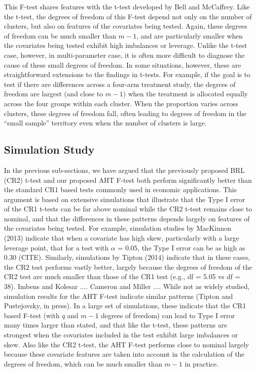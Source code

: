 \documentclass[12pt]{article}
\begin{document}
This F-test shares features with the t-test developed by Bell and McCaffrey. Like the t-test, the degrees of freedom of this F-test depend not only on the number of clusters, but also on features of the covariates being tested. 
Again, these degrees of freedom can be much smaller than $m - 1$, and are particularly smaller when the covariates being tested exhibit high imbalances or leverage. 
Unlike the t-test case, however, in multi-parameter case, it is often more difficult to diagnose the cause of these small degrees of freedom. 
In some situations, however, these are straightforward extensions to the findings in t-tests. 
For example, if the goal is to test if there are differences across a four-arm treatment study, the degrees of freedom are largest (and close to $m - 1$) when the treatment is allocated equally across the four groups within each cluster. 
When the proportion varies across clusters, these degrees of freedom fall, often leading to degrees of freedom in the ``small sample'' territory even when the number of clusters is large. 

\subsection{Simulation Study}

In the previous sub-sections, we have argued that the previously proposed BRL (CR2) t-test and our proposed AHT F-test both perform significantly better than the standard CR1 based tests commonly used in economic applications. 
This argument is based on extensive simulations that illustrate that the Type I error of the CR1 t-tests can be far above nominal while the CR2 t-test remains close to nominal, and that the differences in these patterns depends largely on features of the covariates being tested. 
For example, simulation studies by MacKinnon (2013) indicate that when a covariate has high skew, particularly with a large leverage point, that for a test with $\alpha$ = 0.05, the Type I error can be as high as 0.30 (CITE).
Similarly, simulations by Tipton (2014) indicate that in these cases, the CR2 test performs vastly better, largely because the degrees of freedom of the CR2 test are much smaller than those of the CR1 test (e.g., df = 5.05 vs df = 38).
Imbens and Kolesar ....
Cameron and Miller ....
While not as widely studied, simulation results for the AHT F-test indicate similar patterns (Tipton and Pustejovsky, in press). 
In a large set of simulations, these indicate that the CR1 based F-test (with $q$ and $m - 1$ degrees of freedom) can lead to Type I error many times larger than stated, and that like the t-test, these patterns are strongest when the covariates included in the test exhibit large imbalances or skew. 
Also like the CR2 t-test, the AHT F-test performs close to nominal largely because these covariate features are taken into account in the calculation of the degrees of freedom, which can be much smaller than $m - 1$ in practice.
\end{document}
